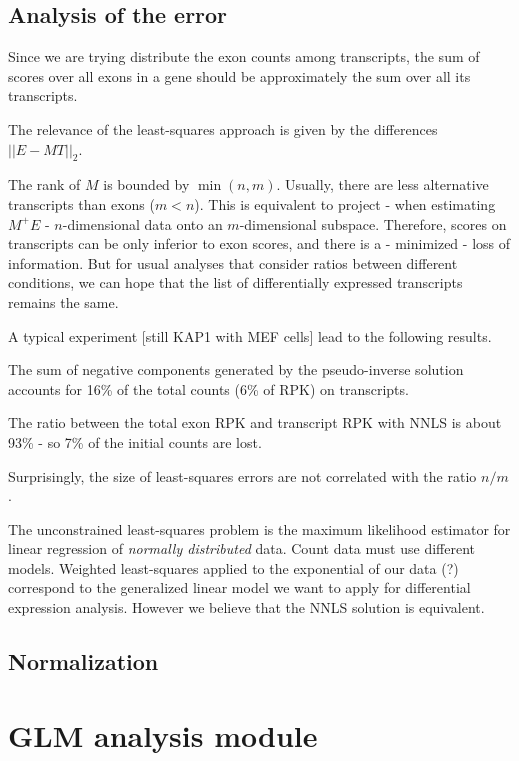\documentclass[a4paper,11pt]{article}
\begin{document}
\subsection{Analysis of the error}

Since we are trying distribute the exon counts among transcripts, the sum of scores over all exons in a gene should be approximately the sum over all its transcripts. 

The relevance of the least-squares approach is given by the differences $||E-MT||_2$.
 
The rank of $M$ is bounded by $\min(n,m)$. Usually, there are less alternative transcripts than exons ($m<n$). This is equivalent to project - when estimating $M^{+}E$ - $n$-dimensional data onto an $m$-dimensional subspace. Therefore, scores on transcripts can be only inferior to exon scores, and there is a - minimized - loss of information. But for usual analyses that consider ratios between different conditions, we can hope that the list of differentially expressed transcripts remains the same. 

A typical experiment [still KAP1 with MEF cells] lead to the following results.

The sum of negative components generated by the pseudo-inverse solution accounts for 16\% of the total counts (6\% of RPK) on transcripts.

The ratio between the total exon RPK and transcript RPK with NNLS is about 93\% - so 7\% of the initial counts are lost.

Surprisingly, the size of least-squares errors are not correlated with the ratio $n/m$.

The unconstrained least-squares problem is the maximum likelihood estimator for linear regression of \emph{normally distributed} data. Count data must use different models. Weighted least-squares applied to the exponential of our data (?) correspond to the generalized linear model we want to apply for differential expression analysis. However we believe that the NNLS solution is equivalent.

\subsection{Normalization}

\section{GLM analysis module}
\end{document}

